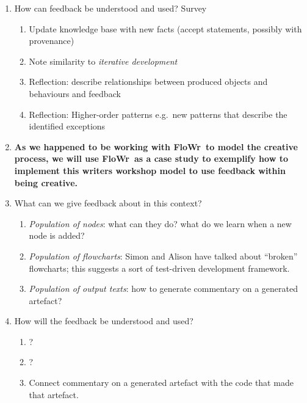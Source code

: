 \documentclass[letter]{article}
\newcommand{\Fw}{{\sf FloWr}}
\newcommand{\dec}[1]{\raisebox{.2ex}{$\star$}#1\raisebox{.2ex}{$\star$}}
\begin{document}
{\begin{enumerate}[start=0,label=\textbf{\arabic*}]
\begin{enumerate}
\item Progress relative to explicit or adduced \emph{exploration}
  (knowledge and accuracy) or \emph{exploitation} (directional,
  task-based) goals.
\item \emph{Quantity}, \emph{Variety}, and \emph{Order} of produced
  objects or behaviours
\item New relationships among produced objects and behaviours drawing
  on a common field of reference
\end{enumerate}
\item[] How can feedback be understood and used? \dec{Survey}
\begin{enumerate}
\item Update knowledge base with new facts (accept statements,
  possibly with provenance)
\item Note similarity to \emph{iterative development}
\item Reflection: describe relationships between produced objects and
  behaviours and feedback
\item Reflection: Higher-order patterns e.g.~new patterns that
  describe the identified exceptions
\end{enumerate}
\item \textbf{As we happened to be working with \Fw\ to model the
  creative process, we will use \Fw\ as a case study to exemplify how
  to implement this writers workshop model to use feedback within
  being creative.}
\item[] What can we give feedback about in this context?
\begin{enumerate}
\item \emph{Population of nodes}: what can they do?  what do we learn when a
  new node is added?
\item \emph{Population of flowcharts}: Simon and Alison have talked
  about ``broken'' flowcharts; this suggests a sort of test-driven
  development framework.
\item \emph{Population of output texts}: how to generate commentary on
  a generated artefact?
\end{enumerate}
\item[] How will the feedback be understood and used?
\begin{enumerate}
\item ?
\item ?
\item Connect commentary on a generated artefact with the code that
  made that artefact.
\end{enumerate}

\end{enumerate}}
\end{document}

